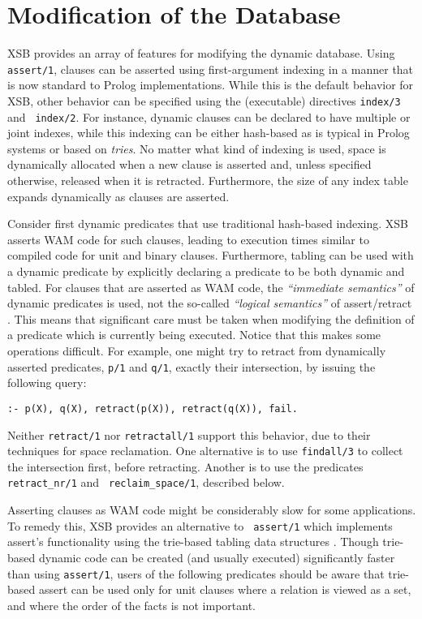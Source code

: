 
\section{Modification of the Database} \label{sec:assert}

XSB provides an array of features for modifying the dynamic database.
Using {\tt assert/1}, clauses can be asserted using first-argument
indexing in a manner that is now standard to Prolog implementations.
While this is the default behavior for XSB, other behavior can be
specified using the (executable) directives {\tt index/3} and {\tt
index/2}.  For instance, dynamic clauses can be declared to have
multiple or joint indexes, while this indexing can be either
hash-based as is typical in Prolog systems or based on {\em tries}.
No matter what kind of indexing is used, space is dynamically
allocated when a new clause is asserted and, unless specified
otherwise, released when it is retracted.  Furthermore, the size of
any index table expands dynamically as clauses are asserted.

Consider first dynamic predicates that use traditional hash-based
indexing.  XSB asserts WAM code for such clauses, leading to execution
times similar to compiled code for unit and binary clauses.
Furthermore, tabling can be used with a dynamic predicate by
explicitly declaring a predicate to be both dynamic and tabled.  For
clauses that are asserted as WAM code, the {\em ``immediate
semantics''} of dynamic predicates is used, not the so-called {\em
``logical semantics''} of assert/retract \cite{LiOk87}. This means
that significant care must be taken when modifying the definition of a
predicate which is currently being executed. Notice that this makes
some operations difficult. For example, one might try to retract from
dynamically asserted predicates, {\tt p/1} and {\tt q/1}, exactly
their intersection, by issuing the following query:
\begin{center} 
{\tt :- p(X), q(X), retract(p(X)), retract(q(X)), fail.}
\end{center}
Neither {\tt retract/1} nor {\tt retractall/1} support this behavior,
due to their techniques for space reclamation.  One alternative is to
use {\tt findall/3} to collect the intersection first, before retracting.
Another is to use the predicates {\tt retract\_nr/1} and {\tt
reclaim\_space/1}, described below.  

Asserting clauses as WAM code might be considerably slow for some
applications.  To remedy this, XSB provides an alternative to {\tt
assert/1} which implements assert's functionality using the trie-based
tabling data structures \cite{RRSSW98}.  Though trie-based dynamic
code can be created (and usually executed) significantly faster than
using {\tt assert/1}, users of the following predicates should be
aware that trie-based assert can be used only for unit clauses where a
relation is viewed as a set, and where the order of the facts is not
important.

